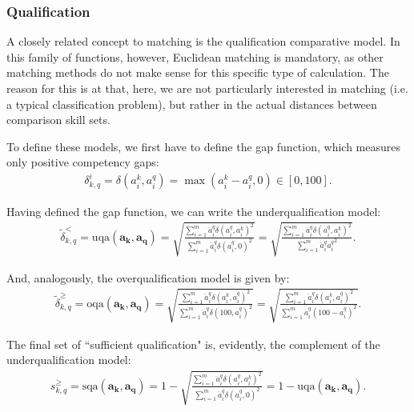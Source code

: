 \documentclass{elsarticle} %
\begin{document}
\subsubsection{Qualification}
A closely related concept to matching is the qualification comparative model.
In this family of functions, however, Euclidean matching is mandatory, as other
matching methods do not make sense for this specific type of calculation. The
reason for this is at that, here, we are not particularly interested in
matching (i.e. a typical classification problem), but rather in the actual
distances between comparison skill sets.

To define these models, we first have to define the gap function, which
measures only positive competency gaps:
\begin{gather}
    \delta_{k,q}^{i} =
    \delta(a_{i}^{k}, a_{i}^{q}) =
    \max(
    a_{i}^{k} - a_{i}^{q}
    , 0
    )
    \in [0, 100]
    .
\end{gather}

Having defined the gap function, we can write the underqualification model:
\begin{gather}
    \tilde{\delta}_{k,q}^{<} =
    \text{uqa}(\boldsymbol{a_k}, \boldsymbol{a_q}) =
    \sqrt{
    \frac{
    \sum_{i=1}^{m}{
    \ddot{a}_{i}^{q} {\delta(a_{i}^{q}, a_{i}^{k})} ^ 2
    }
    }{
    \sum_{i=1}^{m}{
    \ddot{a}_{i}^{q} {\delta(a_{i}^{q}, 0)} ^ 2
    }
    }
    } =
    \sqrt{
    \frac{
    \sum_{i=1}^{m}{
    \ddot{a}_{i}^{q} {\delta(a_{i}^{q}, a_{i}^{k})} ^ 2
    }
    }{
    \sum_{i=1}^{m}{
    \ddot{a}_{i}^{q} {a_{i}^{q}} ^ 2
    }
    }
    }
    .
\end{gather}

And, analogously, the overqualification model is given by:
\begin{gather}
    \tilde{\delta}_{k,q}^{\geq} =
    \text{oqa}(\boldsymbol{a_k}, \boldsymbol{a_q}) =
    \sqrt{
    \frac{
    \sum_{i=1}^{m}{
    \ddot{a}_{i}^{q} {\delta(a_{i}^{k}, a_{i}^{q})} ^ 2
    }
    }{
    \sum_{i=1}^{m}{
    \ddot{a}_{i}^{q} {\delta(100, a_{i}^{q})} ^ 2
    }
    }
    } =
    \sqrt{
    \frac{
    \sum_{i=1}^{m}{
    \ddot{a}_{i}^{q} {\delta(a_{i}^{k}, a_{i}^{q})} ^ 2
    }
    }{
    \sum_{i=1}^{m}{
    \ddot{a}_{i}^{q} {(100 - a_{i}^{q})} ^ 2
    }
    }
    }
    .
\end{gather}

The final set of ``sufficient qualification" is, evidently, the complement of
the underqualification model:
\begin{gather}
    s_{k,q}^{\geq} =
    \text{sqa}(\boldsymbol{a_k}, \boldsymbol{a_q}) =
    1 -
    \sqrt{
    \frac{
    \sum_{i=1}^{m}{
    \ddot{a}_{i}^{q} {\delta(a_{i}^{q}, a_{i}^{k})} ^ 2
    }
    }{
    \sum_{i=1}^{m}{
    \ddot{a}_{i}^{q} {\delta(a_{i}^{q}, 0)} ^ 2
    }
    }
    } =
    1 - \text{uqa}(\boldsymbol{a_k}, \boldsymbol{a_q})
    .
\end{gather}
\end{document}
